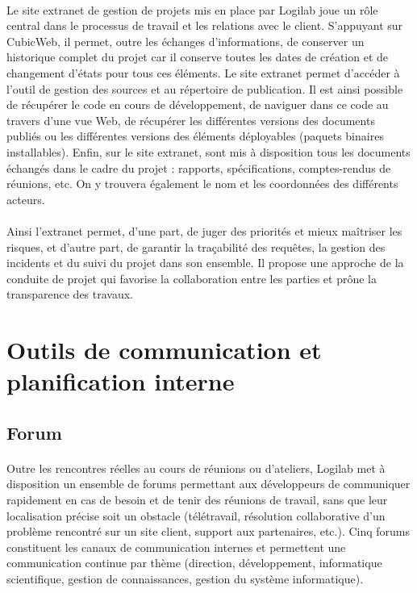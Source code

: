 \documentclass {report}
\begin{document}
\paragraph{}
Le site extranet de gestion de projets mis en place par Logilab joue un rôle central dans le processus de travail et les relations avec le client. S’appuyant sur CubicWeb, il permet, outre les échanges d’informations, de conserver un historique complet du projet car il conserve toutes les dates de création et de changement d’états pour tous ces éléments. Le site extranet permet d’accéder à l’outil de gestion des sources et au répertoire de publication. Il est ainsi possible de récupérer le code en cours de développement, de naviguer dans ce code au travers d’une vue Web, de récupérer les différentes versions des documents publiés ou les différentes versions des éléments déployables (paquets binaires installables). Enfin, sur le site extranet, sont mis à disposition tous les documents échangés dans le cadre du projet : rapports, spécifications, comptes-rendus de réunions, etc. On y trouvera également le nom et les coordonnées des différents acteurs.
\paragraph{}
Ainsi l'extranet permet, d'une part, de juger des priorités et mieux maîtriser les risques, et d'autre part, de garantir la traçabilité des requêtes, la gestion des incidents et du suivi du projet dans son ensemble. Il propose une approche de la conduite de projet qui favorise la collaboration entre les parties et prône la transparence des travaux.



\section{Outils de communication et planification interne}
\subsection{Forum}
\paragraph{}
Outre les rencontres réelles au cours de réunions ou d’ateliers, Logilab met à disposition un ensemble de forums permettant aux développeurs de communiquer rapidement en cas de besoin et de tenir des réunions de travail, sans que leur localisation précise soit un obstacle (télétravail, résolution collaborative d’un problème rencontré sur un site client, support aux partenaires, etc.). Cinq forums constituent les canaux de communication internes et permettent une communication continue par thème (direction, développement,  informatique scientifique, gestion de connaissances, gestion du système informatique).
\end{document}
